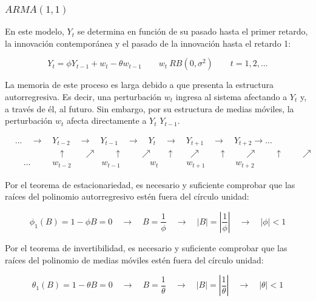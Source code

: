 \documentclass[a4paper,10pt]{article}
\begin{document}
\subsubsection{$ARMA(1,1)$}

En este modelo, $Y_t$ se determina en función de su pasado hasta el primer retardo, la innovación contemporánea y el pasado de la innovación hasta el retardo 1:

\begin{equation}
Y_t = \phi Y_{t-1} + w_t - \theta w_{t-1} \qquad w_t ~ RB (0,\sigma^2) \qquad t=1,2,...
\end{equation}


La memoria de este proceso es larga debido a que presenta la estructura autorregresiva. Es decir, una perturbación $w_t$ ingresa al sistema afectando a $Y_t$ y, a través de él, al futuro. Sin embargo, por su estructura de medias móviles, la perturbación $w_t$ afecta directamente a $Y_t$ $Y_{t-1}$.

\begin{equation*}
\begin{split}
& ... \quad \to \quad Y_{t-2} \quad \to \quad Y_{t-1} \quad \to \quad Y_{t} \quad \to \quad Y_{t+1} \quad \to \quad Y_{t+2} \to ... \\
& \quad \quad \quad \quad \quad \uparrow \quad \quad \nearrow \quad \quad \uparrow \quad \quad \nearrow \quad \;\; \uparrow \quad \;\; \nearrow \quad \quad \uparrow \quad \quad \nearrow \quad \quad \uparrow \quad \quad \nearrow \\
& \quad ...\quad \quad \;\; w_{t-2} \qquad \quad \; \; w_{t-1} \qquad \quad \:\: w_{t} \qquad \quad \; w_{t+1} \qquad \quad \;\; w_{t+2}
\end{split}
\end{equation*}

Por el teorema de estacionariedad, es necesario y suficiente comprobar que las raíces del polinomio autorregresivo estén fuera del círculo unidad:

\begin{equation*}
\phi_1(B) = 1 - \phi B = 0 \quad \to \quad B = \frac{1}{\phi} \quad \to \quad |B| = |\frac{1}{\phi}| \quad \to \quad |\phi| < 1
\end{equation*}

Por el teorema de invertibilidad, es necesario y suficiente comprobar que las raíces del polinomio de medias móviles estén fuera del círculo unidad:

\begin{equation*}
\theta_1(B) = 1 - \theta B = 0 \quad \to \quad B = \frac{1}{\theta} \quad \to \quad |B| = |\frac{1}{\theta}| \quad \to \quad |\theta| < 1
\end{equation*}
\end{document}
